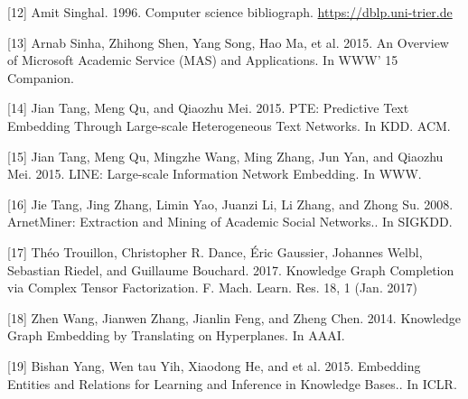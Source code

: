\documentclass[10pt]{article}
\begin{document}
[12] Amit Singhal. 1996. Computer science bibliograph. \href{https://dblp.uni-trier.de}{https://dblp.uni-trier.de}

[13] Arnab Sinha, Zhihong Shen, Yang Song, Hao Ma, et al. 2015. An Overview of Microsoft Academic Service (MAS) and Applications. In WWW' 15 Companion.

[14] Jian Tang, Meng Qu, and Qiaozhu Mei. 2015. PTE: Predictive Text Embedding Through Large-scale Heterogeneous Text Networks. In KDD. ACM.

[15] Jian Tang, Meng Qu, Mingzhe Wang, Ming Zhang, Jun Yan, and Qiaozhu Mei. 2015. LINE: Large-scale Information Network Embedding. In WWW.

[16] Jie Tang, Jing Zhang, Limin Yao, Juanzi Li, Li Zhang, and Zhong Su. 2008. ArnetMiner: Extraction and Mining of Academic Social Networks.. In SIGKDD.

[17] Théo Trouillon, Christopher R. Dance, Éric Gaussier, Johannes Welbl, Sebastian Riedel, and Guillaume Bouchard. 2017. Knowledge Graph Completion via Complex Tensor Factorization. F. Mach. Learn. Res. 18, 1 (Jan. 2017)

[18] Zhen Wang, Jianwen Zhang, Jianlin Feng, and Zheng Chen. 2014. Knowledge Graph Embedding by Translating on Hyperplanes. In AAAI.

[19] Bishan Yang, Wen tau Yih, Xiaodong He, and et al. 2015. Embedding Entities and Relations for Learning and Inference in Knowledge Bases.. In ICLR.
\end{document}
